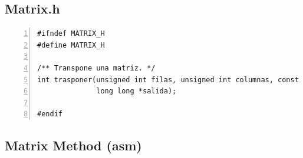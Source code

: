 \documentclass[11pt,a4paper]{article}
\begin{document}
\subsection{Matrix.h}

\begin{lstlisting}[numbers=left, tabsize=2, basicstyle=\fontsize{11}{13}\ttfamily, frame=single, caption={Matrix method (c)}]
#ifndef MATRIX_H
#define MATRIX_H

/** Transpone una matriz. */
int trasponer(unsigned int filas, unsigned int columnas, const long long *entrada,
              long long *salida);

#endif
\end{lstlisting}


\subsection{Matrix Method (asm)}
\end{document}
